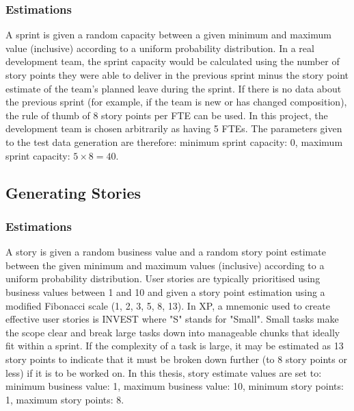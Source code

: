 \subsubsection{Estimations}
A sprint is given a random capacity between a given minimum and maximum value (inclusive) according to a uniform probability distribution. In a real development team, the sprint capacity would be calculated using the number of story points they were able to deliver in the previous sprint minus the story point estimate of the team's planned leave during the sprint. If there is no data about the previous sprint (for example, if the team is new or has changed composition), the rule of thumb of 8 story points per FTE can be used. In this project, the development team is chosen arbitrarily as having 5 FTEs. The parameters given to the test data generation are therefore: minimum sprint capacity: 0, maximum sprint capacity: $5 \times 8 = 40$.

\subsection{Generating Stories}
\subsubsection{Estimations}
A story is given a random business value and a random story point estimate between the given minimum and maximum values (inclusive) according to a uniform probability distribution. User stories are typically prioritised using business values between 1 and 10 and given a story point estimation using a modified Fibonacci scale (1, 2, 3, 5, 8, 13). In XP, a mnemonic used to create effective user stories is INVEST \citep{wake_2003} where "S" stands for "Small". Small tasks make the scope clear and break large tasks down into manageable chunks that ideally fit within a sprint. If the complexity of a task is large, it may be estimated as 13 story points to indicate that it must be broken down further (to 8 story points or less) if it is to be worked on. In this thesis, story estimate values are set to: minimum business value: 1, maximum business value: 10, minimum story points: 1, maximum story points: 8.

